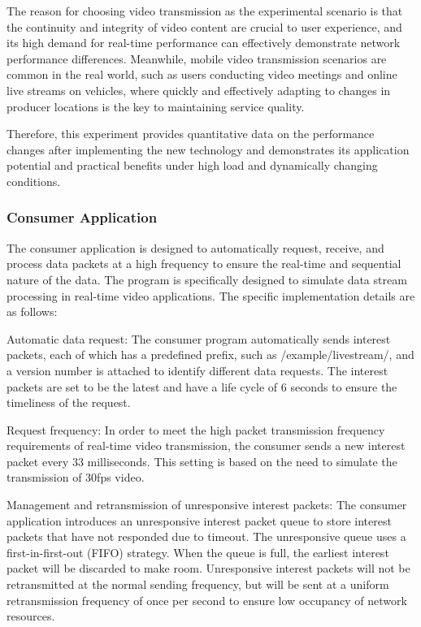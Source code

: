 \documentclass[conference]{IEEEtran}
\begin{document}
The reason for choosing video transmission as the experimental scenario is that the continuity and integrity of video content are crucial to user experience, and its high demand for real-time performance can effectively demonstrate network performance differences. Meanwhile, mobile video transmission scenarios are common in the real world, such as users conducting video meetings and online live streams on vehicles, where quickly and effectively adapting to changes in producer locations is the key to maintaining service quality.

Therefore, this experiment provides quantitative data on the performance changes after implementing the new technology and demonstrates its application potential and practical benefits under high load and dynamically changing conditions.

\subsubsection{Consumer Application}
The consumer application is designed to automatically request, receive, and process data packets at a high frequency to ensure the real-time and sequential nature of the data. The program is specifically designed to simulate data stream processing in real-time video applications. The specific implementation details are as follows:

Automatic data request: The consumer program automatically sends interest packets, each of which has a predefined prefix, such as /example/livestream/, and a version number is attached to identify different data requests. The interest packets are set to be the latest and have a life cycle of 6 seconds to ensure the timeliness of the request.

Request frequency: In order to meet the high packet transmission frequency requirements of real-time video transmission, the consumer sends a new interest packet every 33 milliseconds. This setting is based on the need to simulate the transmission of 30fps video.

Management and retransmission of unresponsive interest packets: The consumer application introduces an unresponsive interest packet queue to store interest packets that have not responded due to timeout. The unresponsive queue uses a first-in-first-out (FIFO) strategy. When the queue is full, the earliest interest packet will be discarded to make room. Unresponsive interest packets will not be retransmitted at the normal sending frequency, but will be sent at a uniform retransmission frequency of once per second to ensure low occupancy of network resources.
\end{document}
